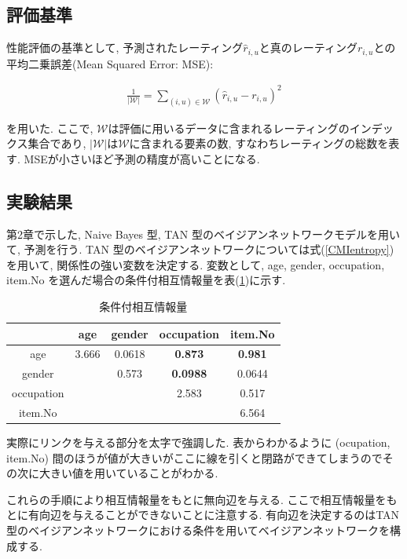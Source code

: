 \documentclass[a4paper]{jarticle}
\begin{document}
\subsection{評価基準}

性能評価の基準として, 予測されたレーティング$\hat{r}_{i, u}$と真のレーティング$r_{i, u}$との平均二乗誤差(Mean Squared Error: MSE):

\begin{eqnarray}
\label{MSE}
\frac{1}{|\mathcal W|} = \sum_{(i, u) \in \mathcal W} (\hat{r}_{i, u} - r_{i, u})^2
\end{eqnarray}

を用いた. ここで, $\mathcal W$は評価に用いるデータに含まれるレーティングのインデックス集合であり, $|\mathcal W|$は$\mathcal W$に含まれる要素の数, すなわちレーティングの総数を表す. MSEが小さいほど予測の精度が高いことになる.

\subsection{実験結果}

第2章で示した, Naive Bayes 型, TAN 型のベイジアンネットワークモデルを用いて, 予測を行う. TAN 型のベイジアンネットワークについては式(\ref{CMIentropy})を用いて, 関係性の強い変数を決定する. 変数として, age, gender, occupation, item.No を選んだ場合の条件付相互情報量を表(\ref{CMIsample})に示す.

\begin{table}[H]
\begin{center}
\label{CMIsample}
\caption{条件付相互情報量}
\begin{tabular}{|c||c|c|c|c|} \hline  
& age & gender & occupation & item.No \\ \hline \hline
age & 3.666 & 0.0618 & \bf{0.873} & \bf{0.981} \\
gender &  & 0.573 & \bf{0.0988} & 0.0644 \\
occupation &  &  & 2.583 & 0.517 \\
item.No &  &  &  & 6.564 \\ \hline
\end{tabular}
\end{center}
\end{table}

実際にリンクを与える部分を太字で強調した. 表からわかるように (ocupation, item.No) 間のほうが値が大きいがここに線を引くと閉路ができてしまうのでその次に大きい値を用いていることがわかる.

これらの手順により相互情報量をもとに無向辺を与える. ここで相互情報量をもとに有向辺を与えることができないことに注意する. 有向辺を決定するのはTAN 型のベイジアンネットワークにおける条件を用いてベイジアンネットワークを構成する.
\end{document}
